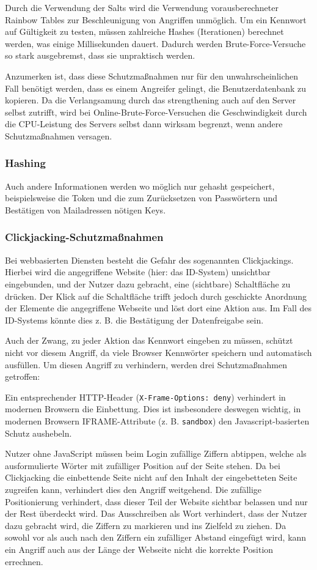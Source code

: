 \documentclass[parskip=half]{scrartcl}
\begin{document}
Durch die Verwendung der Salts wird die Verwendung vorausberechneter Rainbow Tables zur Beschleunigung von Angriffen unmöglich.
Um ein Kennwort auf Gültigkeit zu testen, müssen zahlreiche Hashes (Iterationen) berechnet werden, was einige Millisekunden dauert.
Dadurch werden Brute-Force-Versuche so stark ausgebremst, dass sie unpraktisch werden.

Anzumerken ist, dass diese Schutzmaßnahmen nur für den unwahrscheinlichen Fall benötigt werden, dass es einem Angreifer gelingt, die Benutzerdatenbank zu kopieren.
Da die Verlangsamung durch das strengthening auch auf den Server selbst zutrifft,
wird bei Online-Brute-Force-Versuchen die Geschwindigkeit durch die CPU-Leistung des Servers selbst dann wirksam begrenzt,
wenn andere Schutzmaßnahmen versagen.

\subsubsection{Hashing}
Auch andere Informationen werden wo möglich nur gehasht gespeichert,
beispielsweise die Token und die zum Zurücksetzen von Passwörtern und Bestätigen von Mailadressen nötigen Keys.

\subsubsection{Clickjacking-Schutzmaßnahmen}
Bei webbasierten Diensten besteht die Gefahr des sogenannten Clickjackings.
Hierbei wird die angegriffene Website (hier: das ID-System) unsichtbar eingebunden, und der Nutzer dazu gebracht, eine (sichtbare) Schaltfläche zu drücken.
Der Klick auf die Schaltfläche trifft jedoch durch geschickte Anordnung der Elemente die angegriffene Webseite und löst dort eine Aktion aus.
Im Fall des ID-Systems könnte dies z. B. die Bestätigung der Datenfreigabe sein.

Auch der Zwang, zu jeder Aktion das Kennwort eingeben zu müssen, schützt nicht vor diesem Angriff, da viele Browser Kennwörter speichern und automatisch ausfüllen.
Um diesen Angriff zu verhindern, werden drei Schutzmaßnahmen getroffen:

Ein entsprechender HTTP-Header (\texttt{X-Frame-Options: deny}) verhindert in modernen Browsern die Einbettung.
Dies ist insbesondere deswegen wichtig, in modernen Browsern IFRAME-Attribute (z. B. \texttt{sandbox}) den Javascript-basierten Schutz aushebeln.

Nutzer ohne JavaScript müssen beim Login zufällige Ziffern abtippen, welche als ausformulierte Wörter mit zufälliger Position auf der Seite stehen.
Da bei Clickjacking die einbettende Seite nicht auf den Inhalt der eingebetteten Seite zugreifen kann, verhindert dies den Angriff weitgehend.
Die zufällige Positionierung verhindert, dass dieser Teil der Website sichtbar belassen und nur der Rest überdeckt wird.
Das Ausschreiben als Wort verhindert, dass der Nutzer dazu gebracht wird, die Ziffern zu markieren und ins Zielfeld zu ziehen.
Da sowohl vor als auch nach den Ziffern ein zufälliger Abstand eingefügt wird, kann ein Angriff auch aus der Länge der Webseite nicht die korrekte Position errechnen.
\end{document}
